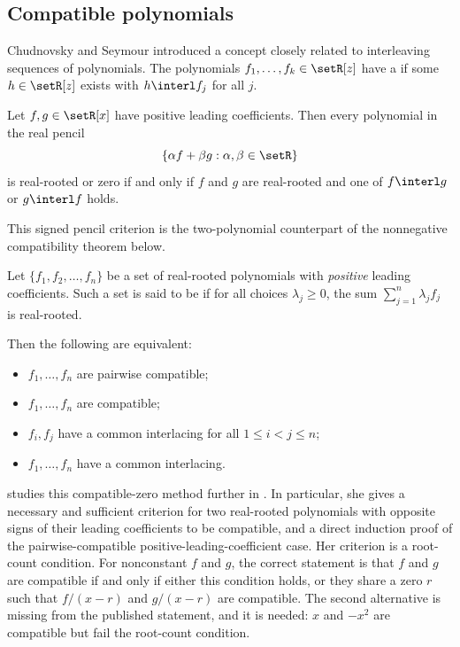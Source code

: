 \subsection[compatiblePolynomials]{Compatible polynomials}

Chudnovsky and Seymour introduced a concept closely related to interleaving
sequences of polynomials.  The polynomials $f_1,\dotsc,f_k \in \setR[z]$
have a \label{commonInterlacing}
if some $h \in \setR[z]$ exists
with $h \interl f_j$ for all $j$.

\begin{theorem}
\label{obreschkoffDedieu}
Let $f,g \in \setR[x]$ have positive leading coefficients.  Then every
polynomial in the real pencil
\[
  \{ \alpha f+\beta g : \alpha,\beta\in\setR\}
\]
is real-rooted or zero if and only if $f$ and $g$ are real-rooted and
one of $f \interl g$ or $g \interl f$ holds.
\end{theorem}

This signed pencil criterion is the two-polynomial counterpart of the
nonnegative compatibility theorem below.

\begin{theorem}
\label{commonInterlacingCompatibilityTheorem}

Let $\{f_1,f_2,\dotsc,f_n\}$ be a set of real-rooted polynomials with
\emph{positive} leading coefficients.
Such a set is said to be \label{compatiblePolynomialSet}
if for all
choices $\lambda_j\geq 0$, the sum $\sum_{j=1}^n \lambda_j f_j$ is real-rooted.

Then the following are equivalent:
\begin{itemize}
\item $f_1,\dotsc,f_n$ are pairwise compatible;
\item $f_1,\dotsc,f_n$ are compatible;
\item $f_i,f_j$ have a common interlacing for all $1\leq i \lt j \leq n$;
\item $f_1,\dotsc,f_n$ have a common interlacing.
\end{itemize}
\end{theorem}
 studies this compatible-zero method further in
\cite{Liu2012CompatibleSequences}.  In particular, she gives a necessary and
sufficient criterion for two real-rooted polynomials with opposite signs of
their leading coefficients to be compatible, and a direct induction proof of
the pairwise-compatible positive-leading-coefficient case.
Her criterion is a root-count condition.  For nonconstant $f$ and $g$, the
correct statement is that $f$ and $g$ are compatible if and only if either
this condition holds, or they share a zero $r$ such that $f/(x-r)$ and
$g/(x-r)$ are compatible.  The second alternative is missing from the
published statement, and it is needed: $x$ and $-x^2$ are compatible but fail
the root-count condition.

